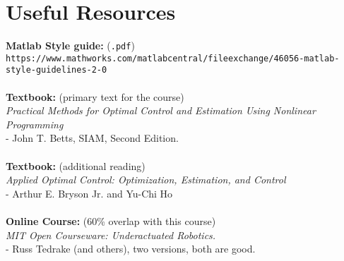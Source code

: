 \documentclass[onecolumn]{article}
\begin{document}
\section*{Useful Resources}

\textbf{Matlab Style guide:} (\texttt{.pdf}) \\
\small{\texttt{https://www.mathworks.com/matlabcentral/fileexchange/46056-matlab-style-guidelines-2-0}}\\
\\
\textbf{Textbook:} (primary text for the course) \\
\textit{Practical Methods for Optimal Control and Estimation Using Nonlinear Programming} \\
- John T. Betts,  SIAM,  Second Edition. \\
\\
\textbf{Textbook:} (additional reading) \\
\textit{Applied Optimal Control: Optimization, Estimation, and Control} \\
- Arthur E. Bryson Jr. and Yu-Chi Ho \\
\\
\textbf{Online Course:} (60\% overlap with this course)\\
\textit{MIT Open Courseware:  Underactuated Robotics.}\\
- Russ Tedrake (and others), two versions, both are good.\\
\\
\\
\end{document}
